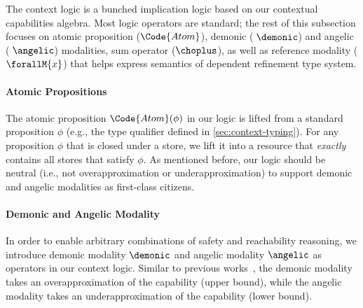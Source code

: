 \begin{definition}
The context logic is a bunched implication logic based on our contextual capabilities algebra. Most logic operators are standard; the rest of this subsection focuses on atomic proposition ($\Code{Atom}$), demonic ($\;\demonic$) and angelic ($\;\angelic$) modalities, sum operator ($\choplus$), as well as reference modality ($\forallM{x}$) that helps express semantics of dependent refinement type system.

\paragraph{Atomic Propositions} The atomic proposition $\Code{Atom}(\phi)$ in our logic is lifted from a standard proposition $\phi$ (e.g., the type qualifier defined in \autoref{sec:context-typing}). For any proposition $\phi$ that is closed under a store, we lift it into a resource that \emph{exactly} contains all stores that satisfy $\phi$. As mentioned before, our logic should be neutral (i.e., not overapproximation or underapproximation) to support demonic and angelic modalities as first-class citizens.

\paragraph{Demonic and Angelic Modality} In order to enable arbitrary combinations of safety and reachability reasoning, we introduce demonic modality $\demonic$ and angelic modality $\angelic$ as operators in our context logic. Similar to previous works~\cite{OHP19}, the demonic modality takes an overapproximation of the capability (upper bound), while the angelic modality takes an underapproximation of the capability (lower bound).


\end{definition}
